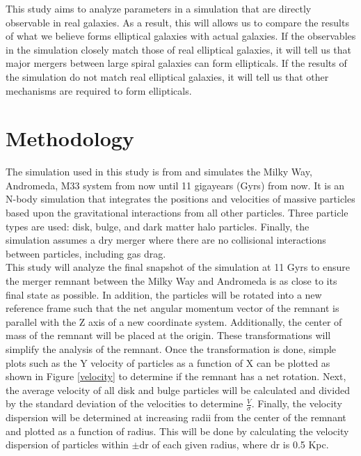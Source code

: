 \documentclass[twocolumn]{aastex63}
\begin{document}
This study aims to analyze parameters in a simulation that are directly observable in real galaxies. As a result, this will allows us to compare the results of what we believe forms elliptical galaxies with actual galaxies. If the observables in the simulation closely match those of real elliptical galaxies, it will tell us that major mergers between large spiral galaxies can form ellipticals. If the results of the simulation do not match real elliptical galaxies, it will tell us that other mechanisms are required to form ellipticals.\\

\section{Methodology}

The simulation used in this study is from \cite{2012ApJ...753....8V} and simulates the Milky Way, Andromeda, M33 system from now until 11 gigayears (Gyrs) from now. It is an N-body simulation that integrates the positions and velocities of massive particles based upon the gravitational interactions from all other particles. Three particle types are used: disk, bulge, and dark matter halo particles. Finally, the simulation assumes a dry merger where there are no collisional interactions between particles, including gas drag.\\

This study will analyze the final snapshot of the simulation at 11 Gyrs to ensure the merger remnant between the Milky Way and Andromeda is as close to its final state as possible. In addition, the particles will be rotated into a new reference frame such that the net angular momentum vector of the remnant is parallel with the Z axis of a new coordinate system. Additionally, the center of mass of the remnant will be placed at the origin. These transformations will simplify the analysis of the remnant. Once the transformation is done, simple plots such as the Y velocity of particles as a function of X can be plotted as shown in Figure \ref{velocity} to determine if the remnant has a net rotation. Next, the average velocity of all disk and bulge particles will be calculated and divided by the standard deviation of the velocities to determine $\frac{V}{\sigma}$. Finally, the velocity dispersion will be determined at increasing radii from the center of the remnant and plotted as a function of radius. This will be done by calculating the velocity dispersion of particles within $\pm$dr of each given radius, where dr is 0.5 Kpc.\\
\end{document}
